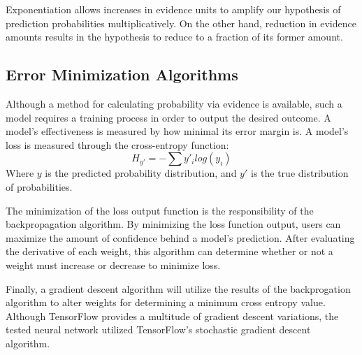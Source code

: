 \documentclass[11pt]{article}
\begin{document}
Exponentiation allows increases in evidence units to amplify our hypothesis of prediction probabilities multiplicatively. On the other hand, reduction in evidence amounts results in the hypothesis to reduce to a fraction of its former amount.~\cite{mnist-for-ml-beginners17}

\subsection{Error Minimization Algorithms}
Although a method for calculating probability via evidence is available, such a model requires a training process in order to output the desired outcome.  A model's effectiveness is measured by how minimal its error margin is.  A model's loss is measured through the cross-entropy function:
\begin{equation}
    H_{y'} = - \sum y'_{i} log(y_{i})
\end{equation}
Where $y$ is the predicted probability distribution, and $y'$ is the true distribution of probabilities.~\cite{mnist-for-ml-beginners17}

The minimization of the loss output function is the responsibility of the backpropagation algorithm.  By minimizing the loss function output, users can maximize the amount of confidence behind a model's prediction.  After evaluating the derivative of each weight, this algorithm can determine whether or not a weight must increase or decrease to minimize loss.~\cite{YannLecunBottouOrrMuller98}

Finally, a gradient descent algorithm will utilize the results of the backprogation algorithm to alter weights for determining a minimum cross entropy value.  Although TensorFlow provides a multitude of gradient descent variations, the tested neural network utilized TensorFlow's stochastic gradient descent algorithm.~\cite{aGuideToLayers17}
\end{document}
